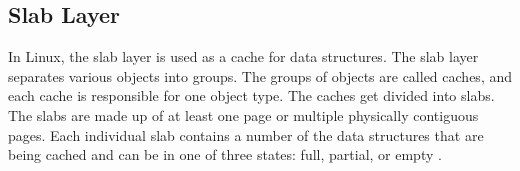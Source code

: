 \subsection{Slab Layer}
In Linux, the slab layer is used as a cache for data structures. The slab layer separates various objects into groups. The groups of objects are called caches, and each cache is responsible for one object type\cite{LinuxTextbook}. The caches get divided into slabs. The slabs are made up of at least one page or multiple physically contiguous pages. Each individual slab contains a number of the data structures that are being cached and can be in one of three states: full, partial, or empty \cite{LinuxTextbook}. 


